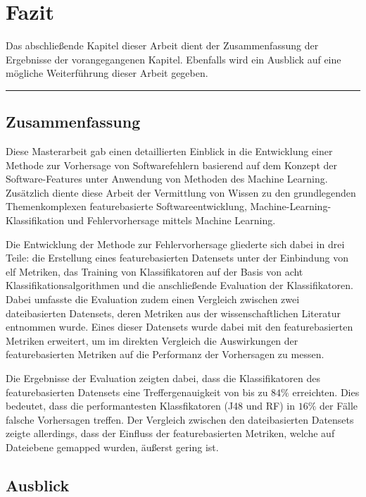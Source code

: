 
\chapter{Fazit}
\label{conclusion}

Das abschließende Kapitel dieser Arbeit dient der Zusammenfassung der Ergebnisse der vorangegangenen Kapitel. Ebenfalls wird ein Ausblick auf eine mögliche Weiterführung dieser Arbeit gegeben.
\\
\hrule

\section{Zusammenfassung}
Diese Masterarbeit gab einen detaillierten Einblick in die Entwicklung einer Methode zur Vorhersage von Softwarefehlern basierend auf dem Konzept der Software-Features unter Anwendung von Methoden des Machine Learning. Zusätzlich diente diese Arbeit der Vermittlung von Wissen zu den grundlegenden Themenkomplexen \glqq featurebasierte Softwareentwicklung\grqq{}, \glqq Machine-Learning-Klassifikation\grqq{} und \glqq Fehlervorhersage mittels Machine Learning\grqq.

Die Entwicklung der Methode zur Fehlervorhersage gliederte sich dabei in drei Teile: die Erstellung eines featurebasierten Datensets unter der Einbindung von elf Metriken, das Training von Klassifikatoren auf der Basis von acht Klassifikationsalgorithmen und die anschließende Evaluation der Klassifikatoren. Dabei umfasste die Evaluation zudem einen Vergleich zwischen zwei dateibasierten Datensets, deren Metriken aus der wissenschaftlichen Literatur entnommen wurde. Eines dieser Datensets wurde dabei mit den featurebasierten Metriken erweitert, um im direkten Vergleich die Auswirkungen der featurebasierten Metriken auf die Performanz der Vorhersagen zu messen.

Die Ergebnisse der Evaluation zeigten dabei, dass die Klassifikatoren des featurebasierten Datensets eine Treffergenauigkeit von bis zu $84\%$ erreichten. Dies bedeutet, dass die performantesten Klassfikatoren (J48 und RF) in $16\%$ der Fälle falsche Vorhersagen treffen. Der Vergleich zwischen den dateibasierten Datensets zeigte allerdings, dass der Einfluss der featurebasierten Metriken, welche auf Dateiebene gemapped wurden, äußerst gering ist. 

\section{Ausblick}

